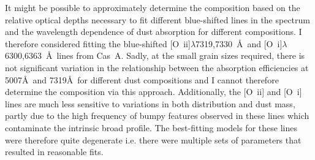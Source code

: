 It might be possible  to approximately determine the composition based on the relative optical depths necessary to fit different blue-shifted lines in the spectrum and the wavelength dependence of dust absorption for different compositions.  I therefore considered fitting the blue-shifted [O~{\sc ii}]$\lambda$7319,7330~\AA\  and [O~{\sc i}]$\lambda$6300,6363~\AA\  lines from Cas~A.  Sadly, at the small grain sizes required, there is not significant variation in the relationship between the absorption efficiencies at 5007\AA\  and 7319\AA\  for different dust compositions and I cannot therefore determine the composition via this approach.  Additionally, the [O~{\sc ii}] and [O~{\sc i}] lines are much less sensitive to variations in both distribution and dust mass, partly due to the high frequency of bumpy features observed in these lines which contaminate the intrinsic broad profile.  The best-fitting models for these lines were therefore quite degenerate i.e. there were multiple sets of parameters that resulted in reasonable fits.  
